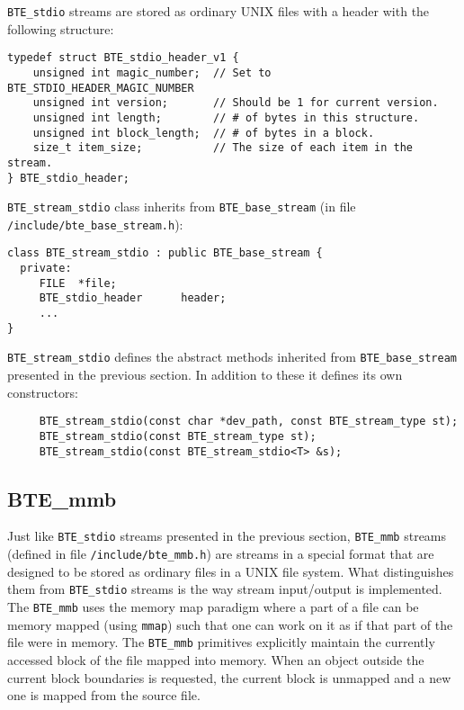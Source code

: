 
\verb|BTE_stdio| streams are stored as ordinary UNIX files with a header with the following structure:

\begin{verbatim}
typedef struct BTE_stdio_header_v1 { 
    unsigned int magic_number;  // Set to BTE_STDIO_HEADER_MAGIC_NUMBER
    unsigned int version;       // Should be 1 for current version.
    unsigned int length;        // # of bytes in this structure.
    unsigned int block_length;  // # of bytes in a block.
    size_t item_size;           // The size of each item in the stream.
} BTE_stdio_header;
\end{verbatim}

\verb|BTE_stream_stdio| class inherits from \verb|BTE_base_stream| (in file
\verb|/include/bte_base_stream.h|):
\begin{verbatim}
class BTE_stream_stdio : public BTE_base_stream {
  private:
     FILE  *file;          
     BTE_stdio_header      header;
     ...
}  
\end{verbatim}

\verb|BTE_stream_stdio| defines the abstract methods inherited from
\verb|BTE_base_stream| presented in the previous section. In addition to these it defines its own
constructors:

\begin{verbatim}
     BTE_stream_stdio(const char *dev_path, const BTE_stream_type st); 
     BTE_stream_stdio(const BTE_stream_type st); 
     BTE_stream_stdio(const BTE_stream_stdio<T> &s);
\end{verbatim}

\subsection{BTE\_mmb}

\tobeextended

Just like \verb|BTE_stdio| streams presented in the previous section,
\verb|BTE_mmb| streams (defined in file \verb|/include/bte_mmb.h|) are
streams in a special format that are designed to be stored as ordinary
files in a UNIX file system. What distinguishes them from \verb|BTE_stdio|
streams is the way stream input/output is implemented. The \verb|BTE_mmb|
uses the memory map paradigm where a part of a file can be memory mapped
(using \verb|mmap|) such that one can work on it as if that part of the
file were in memory. The \verb|BTE_mmb| primitives explicitly maintain the
currently accessed block of the file mapped into memory. When an object
outside the current block boundaries is requested, the current block is
unmapped and a new one is mapped from the source file.

